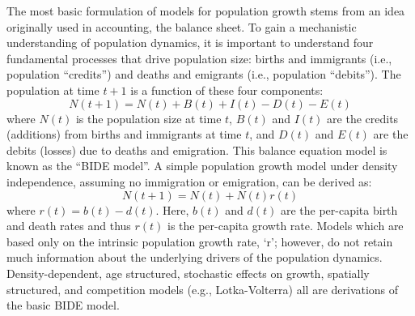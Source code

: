 The most basic formulation of models for population growth stems from
an idea originally used in accounting, the balance sheet.  To gain a
mechanistic understanding of population dynamics, it is important to
understand four fundamental processes that drive population size:
births and immigrants (i.e., population ``credits'') and deaths and
emigrants (i.e., population ``debits'').  The population at time $t+1$
is a function of these four components:
\[
N(t+1) = N(t) + B(t) + I(t) - D(t) - E(t)
\]
where $N(t)$ is the population size at time $t$, $B(t)$ and $I(t)$ are
the credits (additions) from births and immigrants at time $t$, and
$D(t)$ and $E(t)$ are the debits (losses) due to deaths and
emigration.  This balance equation model is known as the ``BIDE
model''.  A simple population growth model under density independence,
assuming no immigration or emigration, can be derived as:
\[
N(t+1) = N(t) + N(t)r(t)
\]
where $r(t) = b(t) - d(t)$.  Here, $b(t)$ and $d(t)$ are the
per-capita birth and death rates and thus $r(t)$ is the per-capita
growth rate. Models which are based only on the intrinsic population
growth rate, `r'; however, do not retain much information about the
underlying drivers of the population dynamics.  Density-dependent, age
structured, stochastic effects on growth, spatially structured, and
competition models (e.g., Lotka-Volterra) all are derivations of the
basic BIDE model.

